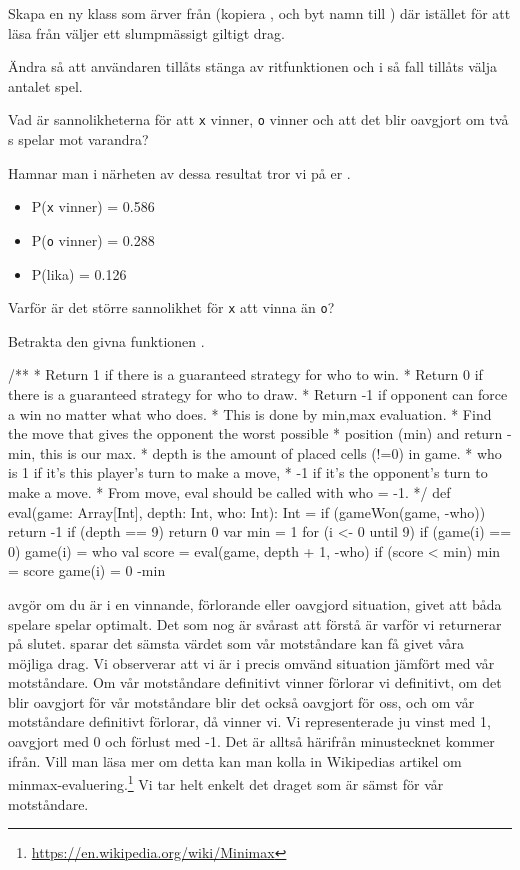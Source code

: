 \Subtask Skapa en ny klass som ärver från  (kopiera , och byt namn till ) där  istället för att läsa från  väljer ett slumpmässigt giltigt drag.

\Subtask Ändra  så att användaren tillåts stänga av ritfunktionen och i så fall tillåts välja antalet spel.

\Subtask Vad är sannolikheterna för att \texttt{x} vinner, \texttt{o} vinner och att det blir oavgjort om två s spelar mot varandra?

Hamnar man i närheten av dessa resultat tror vi på er .
\begin{itemize}
	\item P(\texttt{x} vinner) = 0.586
	\item P(\texttt{o} vinner) = 0.288
	\item P(lika) = 0.126
\end{itemize}

\Subtask Varför är det större sannolikhet för \texttt{x} att vinna än \texttt{o}?

\Task {}

Betrakta den givna funktionen .
\begin{Code}
/**
 * Return 1 if there is a guaranteed strategy for who to win.
 * Return 0 if there is a guaranteed strategy for who to draw.
 * Return -1 if opponent can force a win no matter what who does.
 * This is done by min,max evaluation.
 * Find the move that gives the opponent the worst possible
 * position (min) and return -min, this is our max.
 * depth is the amount of placed cells (!=0) in game.
 * who is 1 if it's this player's turn to make a move,
 * -1 if it's the opponent's turn to make a move.
 * From move, eval should be called with who = -1.
 */
def eval(game: Array[Int], depth: Int, who: Int): Int = {
	if (gameWon(game, -who)) return -1
	if (depth == 9) return 0
	var min = 1
	for (i <- 0 until 9) {
		if (game(i) == 0) {
			game(i) = who
			val score = eval(game, depth + 1, -who)
			if (score < min) {
				min = score
			}
			game(i) = 0
		}
	}
	-min
}
\end{Code}

 avgör om du är i en vinnande, förlorande eller oavgjord situation, givet att båda spelare spelar optimalt. Det som nog är svårast att förstå är varför vi returnerar  på slutet.  sparar det sämsta värdet som vår motståndare kan få givet våra möjliga drag. Vi observerar att vi är i precis omvänd situation jämfört med vår motståndare. Om vår motståndare definitivt vinner förlorar vi definitivt, om det blir oavgjort för vår motståndare blir det också oavgjort för oss, och om vår motståndare definitivt förlorar, då vinner vi. Vi representerade ju vinst med 1, oavgjort med 0 och förlust med -1. Det är alltså härifrån minustecknet kommer ifrån. Vill man läsa mer om detta kan man kolla in Wikipedias artikel om minmax-evaluering.\footnote{\url{https://en.wikipedia.org/wiki/Minimax}} Vi tar helt enkelt det draget som är sämst för vår motståndare.

